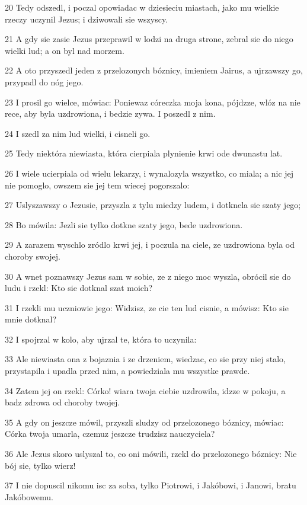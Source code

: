 \par 20 Tedy odszedl, i poczal opowiadac w dziesieciu miastach, jako mu wielkie rzeczy uczynil Jezus; i dziwowali sie wszyscy.
\par 21 A gdy sie zasie Jezus przeprawil w lodzi na druga strone, zebral sie do niego wielki lud; a on byl nad morzem.
\par 22 A oto przyszedl jeden z przelozonych bóznicy, imieniem Jairus, a ujrzawszy go, przypadl do nóg jego.
\par 23 I prosil go wielce, mówiac: Poniewaz córeczka moja kona, pójdzze, wlóz na nie rece, aby byla uzdrowiona, i bedzie zywa. I poszedl z nim.
\par 24 I szedl za nim lud wielki, i cisneli go.
\par 25 Tedy niektóra niewiasta, która cierpiala plynienie krwi ode dwunastu lat.
\par 26 I wiele ucierpiala od wielu lekarzy, i wynalozyla wszystko, co miala; a nic jej nie pomoglo, owszem sie jej tem wiecej pogorszalo:
\par 27 Uslyszawszy o Jezusie, przyszla z tylu miedzy ludem, i dotknela sie szaty jego;
\par 28 Bo mówila: Jezli sie tylko dotkne szaty jego, bede uzdrowiona.
\par 29 A zarazem wyschlo zródlo krwi jej, i poczula na ciele, ze uzdrowiona byla od choroby swojej.
\par 30 A wnet poznawszy Jezus sam w sobie, ze z niego moc wyszla, obrócil sie do ludu i rzekl: Kto sie dotknal szat moich?
\par 31 I rzekli mu uczniowie jego: Widzisz, ze cie ten lud cisnie, a mówisz: Kto sie mnie dotknal?
\par 32 I spojrzal w kolo, aby ujrzal te, która to uczynila:
\par 33 Ale niewiasta ona z bojaznia i ze drzeniem, wiedzac, co sie przy niej stalo, przystapila i upadla przed nim, a powiedziala mu wszystke prawde.
\par 34 Zatem jej on rzekl: Córko! wiara twoja ciebie uzdrowila, idzze w pokoju, a badz zdrowa od choroby twojej.
\par 35 A gdy on jeszcze mówil, przyszli sludzy od przelozonego bóznicy, mówiac: Córka twoja umarla, czemuz jeszcze trudzisz nauczyciela?
\par 36 Ale Jezus skoro uslyszal to, co oni mówili, rzekl do przelozonego bóznicy: Nie bój sie, tylko wierz!
\par 37 I nie dopuscil nikomu isc za soba, tylko Piotrowi, i Jakóbowi, i Janowi, bratu Jakóbowemu.
